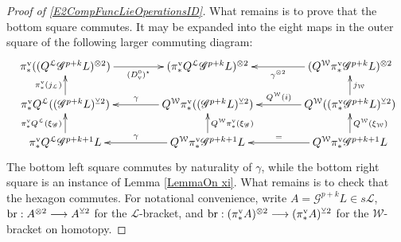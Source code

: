 \documentclass[11pt]{amsart} \renewcommand{\baselinestretch}{1.2}
\theoremstyle{plain}
\theoremstyle{definition}
\renewcommand{\to}{\longrightarrow}
\newcommand{\scrG}{\mathscr{G}}
\newcommand{\calL}{\mathcal{L}}
\newcommand{\calw}{\mathcal{W}}
\newcommand{\call}{\mathcal{L}}
\newcommand{\BSW}{{\scrG}}
\newcommand{\uver}{^\mathrm{v}}
\newcommand{\dver}{_\mathrm{v}}
\newcommand{\smashcoprod}{\veebar}%
\begin{document}
\begin{Operations in composite functor spectral sequences}
\begin{proof}[Proof of \ref{E2CompFuncLieOperationsID}]
What remains is to prove that the bottom square commutes. It may be expanded into the eight maps in the outer square of the following larger commuting diagram:
\[
\xymatrix@R=6mm@C=15mm@!0{
&%
\pi\uver_*((Q^{\calL}\BSW^{p+k}L)^{\otimes2}) \ar[rrr]_-{(D\dver^0)^\star}
&%
&%
&%
(\pi\uver_* Q^{\calL}\BSW^{p+k}L)^{\otimes2}&%
&%
&%
(Q^{\calw}\pi\uver_*\BSW^{p+k}L)^{\otimes2} \ar[lll]^-{\gamma^{\otimes2}}\\\\%
&%
\pi\uver_* Q^{\calL}((\BSW^{p+k}L)^{\smashcoprod 2})\ar[uu]^-{\pi\uver_*(j_{\calL})}
&%
&%
&%
Q^{\calw}\pi\uver_*((\BSW^{p+k}L)^{\smashcoprod 2})\ar[lll]_-{\gamma}
&%
&%
&%
Q^{\calw}((\pi\uver_* \BSW^{p+k}L)^{\smashcoprod 2})
\ar[uu]_-{j_{\calw}}
\ar[lll]_-{Q^{\calw}(i)}
\\\\
&%
\pi\uver_* Q^{\calL}\BSW^{p+k+1}L
\ar[uu]^-{\pi\uver_* Q^{\calL}(\xi_{\BSW})}
&%
&%
&%
Q^{\calw}\pi\uver_*\BSW^{p+k+1}L\ar[lll]_-{\gamma}
\ar[uu]_-{Q^{\calw}\pi\uver_*(\xi_{\BSW})}
&%
&%
&%
Q^{\calw}\pi\uver_* \BSW^{p+k+1}L
\ar[uu]_-{Q^{\calw}(\xi_{\calw})}
\ar[lll]_-{=}
}\]
The bottom left square commutes by naturality of $\gamma$, while the bottom right square is an instance of Lemma \ref{LemmaOn xi}. What remains is to check that the hexagon commutes. For notational convenience, write $A=\BSW^{p+k}L\in s\calL$, $\textup{br}:A^{\otimes 2}\to A^{\smashcoprod 2}$ for the $\call$-bracket, and
$\textup{br}:(\pi\uver_* A)^{\otimes 2}\to (\pi\uver_* A)^{\smashcoprod 2}$ for the $\calw$-bracket on homotopy.


\end{proof}
\end{Operations in composite functor spectral sequences}
\end{document}
